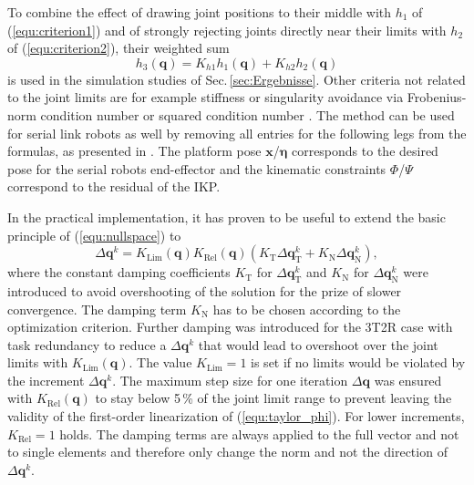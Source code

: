 \documentclass[robotics,article,submit,moreauthors,pdftex]{Definitions/mdpi}
\newcommand{\bm}[1]{\boldsymbol{#1}}
\let\Phi\varPhi
\let\Psi\varPsi
\begin{document}
To combine the effect of drawing joint positions to their middle with $h_1$ of (\ref{equ:criterion1}) and of strongly rejecting joints directly near their limits with $h_2$ of (\ref{equ:criterion2}), their weighted sum
%
\begin{equation}
h_3(\bm{q})
=
K_{h1} h_1(\bm{q}) + K_{h2} h_2(\bm{q})
\label{equ:criterion3}
\end{equation}
%
is used in the simulation studies of Sec.\,\ref{sec:Ergebnisse}.
%
Other criteria not related to the joint limits are for example stiffness \cite{GuoDonKe2015} or singularity avoidance via Frobenius-norm condition number \cite{ZhuQuCaoYan2013} or squared condition number \cite{LegerAng2016}.
The method can be used for serial link robots as well by removing all entries for the following legs from the formulas, as presented in \cite{1_SchapplerTapOrt2019}.
The platform pose $\bm{x}$/$\bm{\eta}$ corresponds to the desired pose for the serial robots end-effector and the kinematic constraints $\bm{\Phi}$/$\bm{\Psi}$ correspond to the residual of the IKP.

In the practical implementation, it has proven to be useful to extend the basic principle of (\ref{equ:nullspace}) to
%
\begin{equation}
{\Delta}\bm{q}^k
=
K_\mathrm{Lim}(\bm{q}) K_\mathrm{Rel}(\bm{q}) (K_\mathrm{T} {\Delta}\bm{q}_{\mathrm{T}}^k + K_\mathrm{N} {\Delta}\bm{q}_{\mathrm{N}}^k),
\label{equ:IK_damping}
\end{equation}
%
where the constant damping coefficients $K_\mathrm{T}$ for ${\Delta}\bm{q}_{\mathrm{T}}^k$ and $K_\mathrm{N}$ for ${\Delta}\bm{q}_{\mathrm{N}}^k$ were introduced to avoid overshooting of the solution for the prize of slower convergence.
The damping term $K_\mathrm{N}$ has to be chosen according to the optimization criterion.
Further damping was introduced for the 3T2R case with task redundancy to reduce a ${\Delta}\bm{q}^{k}$ that would lead to overshoot over the joint limits with $K_\mathrm{Lim}(\bm{q})$. %
The value $K_\mathrm{Lim}=1$ is set if no limits would be violated by the increment ${\Delta}\bm{q}^k$.
The maximum step size for one iteration $\Delta\bm{q}$ was ensured with $K_\mathrm{Rel}(\bm{q})$ to stay below 5\,\% of the joint limit range to prevent leaving the validity of the first-order linearization of (\ref{equ:taylor_phi}).
For lower increments, $K_\mathrm{Rel}=1$ holds.
The damping terms are always applied to the full vector and not to single elements and therefore only change the norm and not the direction of ${\Delta}\bm{q}^k$.
\end{document}
